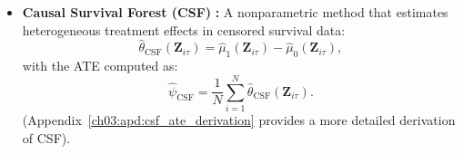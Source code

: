 \begin{itemize}
    \item \textbf{Causal Survival Forest (CSF)} \citep{cui2023estimating}\textbf{:} A nonparametric method that estimates heterogeneous treatment effects in censored survival data:
    \[
    \widehat{\theta}_{\text{CSF}}(\mathbf{Z}_{i\tau}) = \widehat{\mu}_1 (\mathbf{Z}_{i\tau}) - \widehat{\mu}_0 (\mathbf{Z}_{i\tau}),
    \]
    with the ATE computed as:
    \[
    \widehat{\psi}_{\text{CSF}} = \frac{1}{N} \sum_{i=1}^{N} \widehat{\theta}_{\text{CSF}}(\mathbf{Z}_{i\tau}).
    \]
    (Appendix~\ref{ch03:apd:csf_ate_derivation} provides a more detailed derivation of CSF).
\end{itemize}

